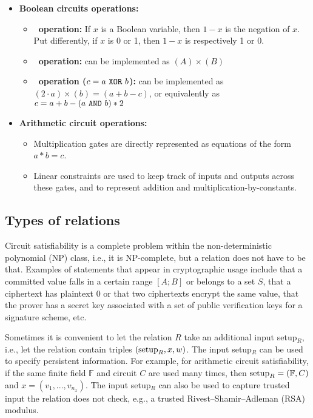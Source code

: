 \begin{itemize}


\item \textbf{Boolean circuits operations:}

	\begin{itemize}

	\item \textbf{\NOT\ operation:}
	If $x$ is a Boolean variable, then $1-x$ is the negation of $x$.
	Put differently, if $x$ is 0 or 1, then $1-x$ is respectively 1 or 0.

	\item \textbf{\AND\ operation:} 
	can be implemented as $(A) \times (B)$

	\item \textbf{\XOR\ operation ($c = a~\texttt{XOR}~b$):}
	can be implemented as $(2 \cdot a ) \times (b) = (a + b - c)$, or equivalently as $c = a + b - (a~\texttt{AND}~b) \ast 2$
	\end{itemize}


\item \textbf{Arithmetic circuit operations:} 

	\begin{itemize}
	\item Multiplication gates are directly represented as equations of the form $a \ast b = c$.
	\item Linear constraints are used to keep track of inputs and outputs across these gates, and to represent addition and multiplication-by-constants.
	\end{itemize}

\end{itemize}


\subsection{Types of relations}
\label{security:spec-statements-ZK:types-of-relations}


Circuit satisfiability is a complete problem within the non-deter\-min\-istic polynomial (NP) class, i.e., it is NP-complete, but a relation does not have to be that. 
Examples of statements that appear in cryptographic usage include that a committed value falls in a certain range $[A;B]$ or belongs to a set $S$, that a ciphertext has plaintext 0 or that two ciphertexts encrypt the same value, that the prover has a secret key associated with a set of public verification keys for a signature scheme, etc.


Sometimes it is convenient to let the relation $R$ take an additional input setup$_R$, i.e., let the relation contain triples $(\textmd{setup}_R, x, w)$. 
The input setup$_R$ can be used to specify persistent information.
For example, for arithmetic circuit satisfiability, if the same finite field $\mathbb{F}$ and circuit $C$ are used many times, then $\textmd{setup}_R = (\mathbb{F}, C)$ and $x = (v_1,...,v_{n_x})$.
The input setup$_R$ can also be used to capture trusted input the relation does not check, e.g., a trusted Rivest--Shamir--Adleman (RSA) modulus.
